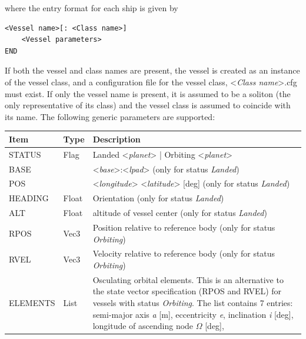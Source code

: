 \documentclass[Orbiter Developer Manual.tex]{subfiles}
\begin{document}
\noindent
where the entry format for each ship is given by

\begin{lstlisting}[language=OSFS]
<Vessel name>[: <Class name>]
	<Vessel parameters>
END
\end{lstlisting}

\noindent
If both the vessel and class names are present, the vessel is created as an instance of the vessel class, and a configuration file for the vessel class, <\textit{Class name}>.cfg must exist. If only the vessel name is present, it is assumed to be a soliton (the only representative of its class) and the vessel class is assumed to coincide with its name.
The following generic parameters are supported:

	\begin{longtable}{ |p{}|p{}|p{}| }
	\hline\rule{0pt}{2ex}
	\textbf{Item} & \textbf{Type} & \textbf{Description}\\
	\hline\rule{0pt}{2ex}
	STATUS & Flag & Landed <\textit{planet}> | Orbiting <\textit{planet}>\\
	\hline\rule{0pt}{2ex}
	BASE &  & <\textit{base}>:<\textit{lpad}> (only for status \textit{Landed})\\
	\hline\rule{0pt}{2ex}
	POS &  & <\textit{longitude}> <\textit{latitude}> [deg] (only for status \textit{Landed})\\
	\hline\rule{0pt}{2ex}
	HEADING & Float & Orientation (only for status \textit{Landed})\\
	\hline\rule{0pt}{2ex}
	ALT & Float & altitude of vessel center (only for status \textit{Landed})\\
	\hline\rule{0pt}{2ex}
	RPOS & Vec3 & Position relative to reference body (only for status \textit{Orbiting})\\
	\hline\rule{0pt}{2ex}
	RVEL & Vec3 & Velocity relative to reference body (only for status \textit{Orbiting})\\
	\hline\rule{0pt}{2ex}
	ELEMENTS & List & Osculating orbital elements. This is an alternative to the state vector specification (RPOS and RVEL) for vessels with status \textit{Orbiting}. The list contains 7 entries:\newline
	semi-major axis \textit{a} [m],\newline
	eccentricity \textit{e},\newline
	inclination \textit{i} [deg],\newline
	longitude of ascending node $\Omega$ [deg],\newline

\end{longtable}
\end{document}
